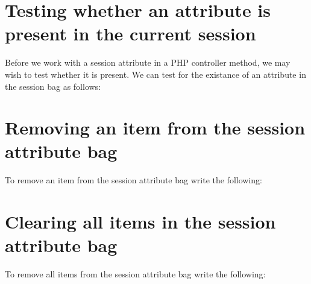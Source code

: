 \documentclass[a4paperpaper,openright]{book}
\newenvironment{Shaded}{}{}
\newcommand{\CommentTok}[1]{\textcolor[rgb]{0.38,0.63,0.69}{\textit{#1}}}
\newcommand{\KeywordTok}[1]{\textcolor[rgb]{0.00,0.44,0.13}{\textbf{#1}}}
\newcommand{\NormalTok}[1]{#1}
\newcommand{\OtherTok}[1]{\textcolor[rgb]{0.00,0.44,0.13}{#1}}
\newcommand{\StringTok}[1]{\textcolor[rgb]{0.25,0.44,0.63}{#1}}
\begin{document}
\hypertarget{testing-whether-an-attribute-is-present-in-the-current-session}{%
\section{Testing whether an attribute is present in the current
session}\label{testing-whether-an-attribute-is-present-in-the-current-session}}

Before we work with a session attribute in a PHP controller method, we
may wish to test whether it is present. We can test for the existance of
an attribute in the session bag as follows:

\begin{Shaded}
\end{Shaded}

\hypertarget{removing-an-item-from-the-session-attribute-bag}{%
\section{Removing an item from the session attribute
bag}\label{removing-an-item-from-the-session-attribute-bag}}

To remove an item from the session attribute bag write the following:

\begin{Shaded}
\end{Shaded}

\hypertarget{clearing-all-items-in-the-session-attribute-bag}{%
\section{Clearing all items in the session attribute
bag}\label{clearing-all-items-in-the-session-attribute-bag}}

To remove all items from the session attribute bag write the following:

\begin{Shaded}
\end{Shaded}
\end{document}
